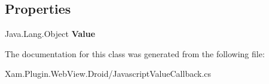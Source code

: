 \subsection*{Properties}
\begin{DoxyCompactItemize}
\item 
\mbox{\label{class_xam_1_1_plugin_1_1_web_view_1_1_droid_1_1_javascript_value_callback_a6a582f542624ddbe8e1a9a353c572832}} 
Java.\+Lang.\+Object {\bfseries Value}
\end{DoxyCompactItemize}


The documentation for this class was generated from the following file\+:\begin{DoxyCompactItemize}
\item 
Xam.\+Plugin.\+Web\+View.\+Droid/Javascript\+Value\+Callback.\+cs\end{DoxyCompactItemize}
